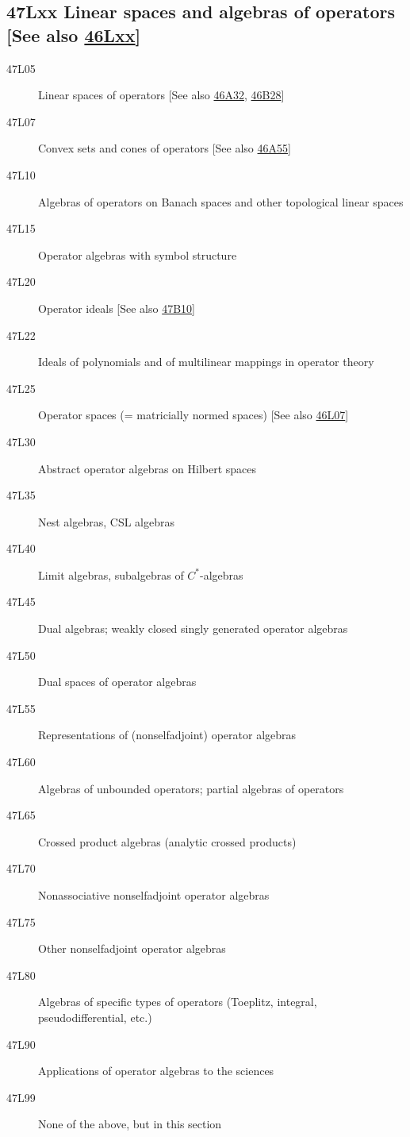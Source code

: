 \subsection*{47Lxx  Linear spaces and algebras of operators [See also \hyperref[46Lxx]{46Lxx}] }\label{47Lxx}
\begin{description}  
\item [47L05]\label{47L05} Linear spaces of operators [See also \hyperref[46A32]{46A32}, \hyperref[46B28]{46B28}]
\item [47L07]\label{47L07} Convex sets and cones of operators [See also \hyperref[46A55]{46A55}]
\item [47L10]\label{47L10} Algebras of operators on Banach spaces and other topological linear spaces
\item [47L15]\label{47L15} Operator algebras with symbol structure
\item [47L20]\label{47L20} Operator ideals [See also \hyperref[47B10]{47B10}]
\item [47L22]\label{47L22} Ideals of polynomials and of multilinear mappings in operator theory
\item [47L25]\label{47L25} Operator spaces (= matricially normed spaces) [See also \hyperref[46L07]{46L07}]
\item [47L30]\label{47L30} Abstract operator algebras on Hilbert spaces
\item [47L35]\label{47L35} Nest algebras, CSL algebras
\item [47L40]\label{47L40} Limit algebras, subalgebras of $C^*$-algebras
\item [47L45]\label{47L45} Dual algebras; weakly closed singly generated operator algebras
\item [47L50]\label{47L50} Dual spaces of operator algebras
\item [47L55]\label{47L55} Representations of (nonselfadjoint) operator algebras
\item [47L60]\label{47L60} Algebras of unbounded operators; partial algebras of operators
\item [47L65]\label{47L65} Crossed product algebras (analytic crossed products)
\item [47L70]\label{47L70} Nonassociative nonselfadjoint operator algebras
\item [47L75]\label{47L75} Other nonselfadjoint operator algebras
\item [47L80]\label{47L80} Algebras of specific types of operators (Toeplitz, integral, pseudodifferential, etc.)
\item [47L90]\label{47L90} Applications of operator algebras to the sciences
\item [47L99]\label{47L99} None of the above, but in this section
\end{description}
